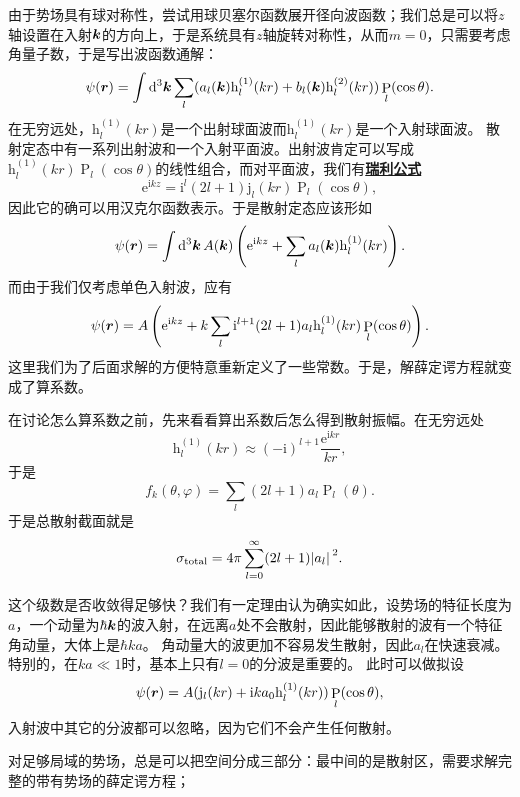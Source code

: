 \documentclass[UTF8, a4paper]{ctexart}
\newcommand*{\ee}{\mathrm{e}}
\newcommand*{\ii}{\mathrm{i}}
\DeclareMathOperator{\legpoly}{P}
\newcommand*{\hankelone}{\mathrm{h}^{(1)}}
\newcommand*{\hankeltwo}{\mathrm{h}^{(2)}}
\newcommand{\concept}[1]{\underline{\textbf{#1}}}
\begin{document}
由于势场具有球对称性，尝试用球贝塞尔函数展开径向波函数；我们总是可以将$z$轴设置在入射$\vb*{k}$的方向上，于是系统具有$z$轴旋转对称性，从而$m=0$，只需要考虑角量子数，于是写出波函数通解：
\[
    \psi(\vb*{r}) = \int \dd[3]{\vb*{k}} \sum_{l} (a_l(\vb*{k}) \hankelone_l(kr) + b_l(\vb*{k}) \hankeltwo_l(kr)) \legpoly_l(\cos \theta).
\]
在无穷远处，$\hankelone_l(kr)$是一个出射球面波而$\hankelone_l(kr)$是一个入射球面波。
散射定态中有一系列出射波和一个入射平面波。出射波肯定可以写成$\hankelone_l(kr) \legpoly_l (\cos \theta)$的线性组合，而对平面波，我们有\concept{瑞利公式}
\begin{equation}
    \ee^{\ii k z} = \ii^l (2l+1) \mathrm{j}_l (kr) \legpoly_l(\cos \theta),
\end{equation}
因此它的确可以用汉克尔函数表示。于是散射定态应该形如
\[
    \psi(\vb*{r}) = \int \dd[3]{\vb*{k}} A(\vb*{k}) \left( \ee^{\ii k z} + \sum_l a_l(\vb*{k}) \hankelone_l(kr)  \right).
\]
而由于我们仅考虑单色入射波，应有
\begin{equation}
    \psi(\vb*{r}) = A\left( \ee^{\ii k z} + k \sum_l \ii^{l+1} (2l+1) a_l \hankelone_l(kr) \legpoly_l(\cos \theta) \right).
\end{equation}
这里我们为了后面求解的方便特意重新定义了一些常数。于是，解薛定谔方程就变成了算系数。

在讨论怎么算系数之前，先来看看算出系数后怎么得到散射振幅。在无穷远处
\[
    \hankelone_l(kr) \approx (-\ii)^{l+1} \frac{\ee^{\ii k r}}{kr},
\]
于是
\begin{equation}
    f_k(\theta, \varphi) = \sum_l (2l+1) a_l \legpoly_l(\theta).
\end{equation}
于是总散射截面就是
\begin{equation}
    \sigma_\text{total} = 4\pi \sum_{l=0}^\infty (2l+1) \abs*{a_l}^2. 
\end{equation}

这个级数是否收敛得足够快？我们有一定理由认为确实如此，设势场的特征长度为$a$，一个动量为$\hbar \vb*{k}$的波入射，在远离$a$处不会散射，因此能够散射的波有一个特征角动量，大体上是$\hbar k a$。
角动量大的波更加不容易发生散射，因此$a_l$在快速衰减。特别的，在$k a \ll 1$时，基本上只有$l=0$的分波是重要的。
此时可以做拟设
\begin{equation}
    \psi(\vb*{r}) = A (\mathrm{j}_l(kr) + \ii k a_0 \hankelone_l(kr)) \legpoly_l(\cos \theta),
\end{equation}
入射波中其它的分波都可以忽略，因为它们不会产生任何散射。

对足够局域的势场，总是可以把空间分成三部分：最中间的是散射区，需要求解完整的带有势场的薛定谔方程；
\end{document}
